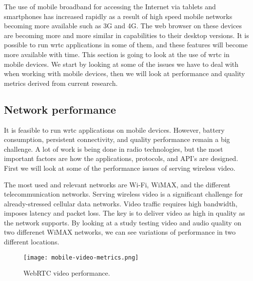 
The use of mobile broadband for accessing the Internet via tablets and smartphones has increased rapidly as a result of high speed mobile networks becoming more available such as 3G and 4G. The web browser on these devices are becoming more and more similar in capabilities to their desktop versions. It is possible to run \gls{wrtc} applications in some of them, and these features will become more available with time. This section is going to look at the use of \gls{wrtc} in mobile devices. We start by looking at some of the issues we have to deal with when working with mobile devices, then we will look at performance and quality metrics derived from current research.

\subsection{Network performance}
It is feasible to run \gls{wrtc} applications on mobile devices. However, battery consumption, persistent connectivity, and quality performance remain a big challenge. A lot of work is being done in radio technologies, but the most important factors are how the applications, protocols, and API's are designed\cite{isomaki2012considerations}. First we will look at some of the performance issues of serving wireless video.

The most used and relevant networks are Wi-Fi, WiMAX, and the different telecommunication networks. Serving wireless video is a significant challenge for already-stressed cellular data networks\cite{erman2011over}. Video traffic requires high bandwidth, imposes latency and packet loss. The key is to deliver video as high in quality as the network supports. By looking at a study testing video and audio quality on two differenet WiMAX networks\cite{fund2013performance}, we can see variations of performance in two different locations.

\pagebreak
\begin{figure}[here]
\centerline{\texttt{[image: mobile-video-metrics.png]}}
\caption{WebRTC video performance\cite{fund2013performance}.}
\label{fig:mobile-video-metrics}
\end{figure}

